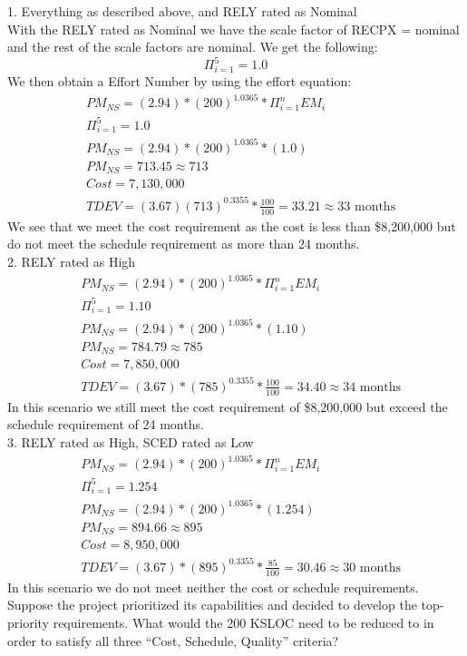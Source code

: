 \documentclass[12pt,letterpaper]{article}
\begin{document}
1.	Everything as described above, and RELY rated as Nominal\\
With the RELY rated as Nominal we have the scale factor of RECPX = nominal and the rest of the scale factors are nominal. We get the following:
    \begin{equation*}
        \Pi_{i=1}^{5} = 1.0
    \end{equation*}
We then obtain a Effort Number by using the effort equation:
    \begin{align*}
        &PM_{NS} = (2.94)*(200)^{1.0365} * \Pi_{i=1}^{n}EM_i\\
        &\Pi_{i=1}^{5} = 1.0\\
        &PM_{NS} = (2.94)*(200)^{1.0365} * (1.0) \\
        &PM_{NS} = 713.45 \approx 713 \\
        &Cost = 7,130,000\\
        &TDEV = (3.67)(713)^{0.3355}* \frac{100}{100} =  33.21 \approx 33  \text{ months}
    \end{align*}
We see that we meet the cost requirement as the cost is less than \$8,200,000 but do not meet the schedule requirement as more than 24 months.\\
2.	RELY rated as High\\
    \begin{align*}
        &PM_{NS} = (2.94)*(200)^{1.0365} * \Pi_{i=1}^{n}EM_i\\
        &\Pi_{i=1}^{5} = 1.10\\
        &PM_{NS} = (2.94)*(200)^{1.0365} * (1.10) \\
        &PM_{NS} = 784.79\approx 785\\
        &Cost = 7,850,000\\
        &TDEV = (3.67)*(785)^{0.3355}* \frac{100}{100} = 34.40 \approx 34 \text{ months}
    \end{align*}
In this scenario we still meet the cost requirement of \$8,200,000 but exceed the schedule requirement of 24 months.\\
3.	RELY rated as High, SCED rated as Low
    \begin{align*}
        &PM_{NS} = (2.94)*(200)^{1.0365} * \Pi_{i=1}^{n}EM_i\\
        &\Pi_{i=1}^{5} = 1.254\\
        &PM_{NS} = (2.94)*(200)^{1.0365} * (1.254) \\
        &PM_{NS} =  894.66\approx 895  \\
        &Cost = 8,950,000\\
        &TDEV = (3.67)*(895)^{0.3355}* \frac{85}{100} = 30.46 \approx 30 \text{ months}
    \end{align*}
In this scenario we do not meet neither the cost or schedule requirements.\\
Suppose the project prioritized its capabilities and decided to develop the top-priority requirements.  What would the 200 KSLOC need to be reduced to in order to satisfy all three “Cost, Schedule, Quality” criteria?\\
\end{document}

